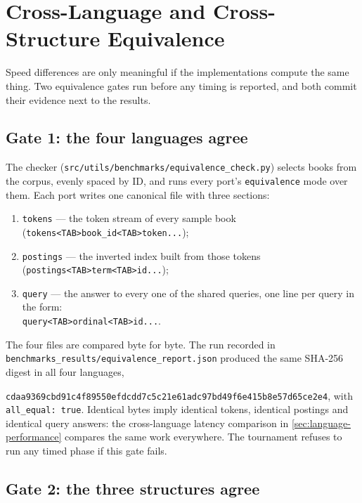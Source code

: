 \section{Cross-Language and Cross-Structure Equivalence}
\label{sec:equivalence}

Speed differences are only meaningful if the implementations compute the same
thing. Two equivalence gates run before any timing is reported, and both
commit their evidence next to the results.

\subsection{Gate 1: the four languages agree}
\label{sec:equivalence-languages}

The checker (\texttt{src/utils/benchmarks/equivalence\_check.py}) selects
 books from the corpus, evenly spaced by ID, and runs every
port's \texttt{equivalence} mode over them. Each port writes one canonical
file with three sections:

\begin{enumerate}
    \item \texttt{tokens} --- the token stream of every sample book
    (\texttt{tokens<TAB>book\_id<TAB>token...});
    \item \texttt{postings} --- the inverted index built from those tokens
    (\texttt{postings<TAB>term<TAB>id...});
    \item \texttt{query} --- the answer to every one of the 
    shared queries, one line per query in the form:\\
    \texttt{query<TAB>ordinal<TAB>id...}.
\end{enumerate}

The four files are compared byte for byte. The run recorded in
\texttt{benchmarks\_\allowbreak results/\allowbreak equivalence\_\allowbreak report.json} produced the same
SHA-256 digest in all four languages,
\par\noindent\texttt{cdaa9369cbd91c4f89550efdcdd7c5c2\allowbreak 1e61adc97bd49f6e415b8e57d65ce2e4},
with \texttt{all\_equal: true}. Identical bytes imply identical tokens,
identical postings and identical query answers: the cross-language latency
comparison in \cref{sec:language-performance} compares the same work
everywhere. The tournament refuses to run any timed phase if this gate fails.

\subsection{Gate 2: the three structures agree}
\label{sec:equivalence-structures}

